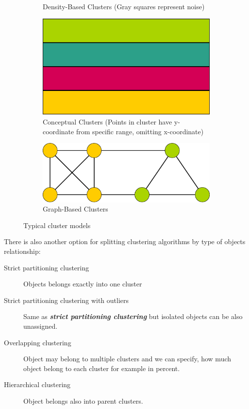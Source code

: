 \begin{figure}[h]
\begin{subfigure}{.5\textwidth}
  \caption{Density-Based Clusters (Gray squares represent noise)}
  \label{fig:densityClusters}
\end{subfigure}%
\vspace*{0.5cm} 
\begin{subfigure}{.5\textwidth}
  \centering
  \includegraphics[width=.5\linewidth]{img/conceptualClusters.eps}
  \caption{Conceptual Clusters (Points in cluster have y-coordinate from specific range, omitting x-coordinate)}
  \label{fig:conceptualClusters}
\end{subfigure}%
\begin{subfigure}{.5\textwidth}
  \centering
  \includegraphics[width=.5\linewidth]{img/graphClusters.eps}
  \caption{Graph-Based Clusters}
  \label{fig:graphClusters}
\end{subfigure}%
\caption{Typical cluster models}
\end{figure}

\vspace{8 mm}
\noindent
There is also another option for splitting clustering algorithms by type of objects relationship: 

\begin{description}
\item[Strict partitioning clustering] Objects belongs exactly into one cluster
\item[Strict partitioning clustering with outliers] Same as \textit{\textbf{strict partitioning clustering}} but isolated objects can be also unassigned. 
\item[Overlapping clustering] Object may belong to multiple clusters and we can specify, how much object belong to each cluster for example in percent.
\item[Hierarchical clustering] Object belongs also into parent clusters.
\end{description}
 \pagebreak
